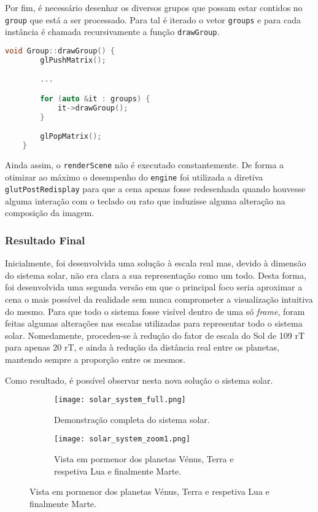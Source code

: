 \documentclass[a4paper]{article}
\begin{document}
Por fim, é necessário desenhar os diversos grupos que possam estar contidos no \texttt{group} que está a ser processado. Para tal é iterado o vetor \texttt{groups} e para cada instância é chamada recursivamente a função \texttt{drawGroup}.

\begin{lstlisting}[language=C++, caption=Desenho do \texttt{group}.]
    void Group::drawGroup() {
        glPushMatrix();

        ...

        for (auto &it : groups) {
            it->drawGroup();
        }

        glPopMatrix();
    }
\end{lstlisting}

Ainda assim, o \texttt{renderScene} não é executado constantemente. De forma a otimizar ao máximo o desempenho do \texttt{engine} foi utilizada a diretiva \texttt{glutPostRedisplay} para que a cena apenas fosse redesenhada quando houvesse alguma interação com o teclado ou rato que induzisse alguma alteração na composição da imagem.

\subsubsection{Resultado Final}

\hspace{3mm} Inicialmente, foi desenvolvida uma solução à escala real mas, devido à dimensão do sistema solar, não era clara a sua representação como um todo. Desta forma, foi desenvolvida uma segunda versão em que o principal foco seria aproximar a cena o mais possível da realidade sem nunca comprometer a visualização intuitiva do mesmo. Para que todo o sistema fosse visível dentro de uma só \emph{frame}, foram feitas algumas alterações nas escalas utilizadas para representar todo o sistema solar. Nomedamente, procedeu-se à redução do fator de escala do Sol de 109 rT para apenas 20 rT, e ainda à redução da distância real entre os planetas, mantendo sempre a proporção entre os mesmos.

\par Como resultado, é possível observar nesta nova solução o sistema solar.

\begin{figure}[h]
    \centering
    \begin{subfigure}{0.5\textwidth}
        \centering
        \texttt{[image: solar\_system\_full.png]}
        \caption{Demonstração completa do sistema solar.}
    \end{subfigure}%
    \begin{subfigure}{0.5\textwidth}
        \centering
        \texttt{[image: solar\_system\_zoom1.png]}
        \caption{Vista em pormenor dos planetas Vénus, Terra e respetiva Lua e finalmente Marte.}
    \end{subfigure}
    \label{fig:solar_system}
\end{figure}
\end{document}
